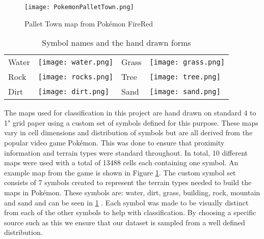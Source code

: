\begin{figure}[h]
\begin{center}
\texttt{[image: PokemonPalletTown.png]}
\end{center}
\caption{Pallet Town map from Pok\'{e}mon FireRed \cite{firered}}
\label{fig:pokemon}
\end{figure}

\begin{table}
\label{table:symbols}
\caption{Symbol names and the hand drawn forms}
\begin{center}
\begin{tabular}{llll}
Water & \texttt{[image: water.png]} &
Grass & \texttt{[image: grass.png]} \\
Rock & \texttt{[image: rocks.png]} &
Tree & \texttt{[image: tree.png]} \\
Dirt & \texttt{[image: dirt.png]} &
Sand & \texttt{[image: sand.png]} \\
\end{tabular}
\end{center}
\end{table}


The maps used for classification in this project are hand drawn on standard 4
to 1" grid paper using a custom set of symbols defined for this purpose. These
maps vary in cell dimensions and distribution of symbols but are all derived
from the popular video game Pok\'{e}mon. This was done to ensure that proximity
information and terrain types were standard throughout. In total, 10 different
maps were used with a total of 13488 cells each containing one symbol. An
example map from the game is shown in Figure \ref{fig:pokemon}.  The custom
symbol set consists of 7 symbols created to represent the terrain types needed
to build the maps in Pok\'{e}mon. These symbols are: water, dirt, grass,
building, rock, mountain and sand and can be seen in \ref{table:symbols} . Each
symbol was made to be visually distinct from each of the other symbols to help
with classification. By choosing a specific source such as this we ensure that
our dataset is sampled from a well defined distribution.


